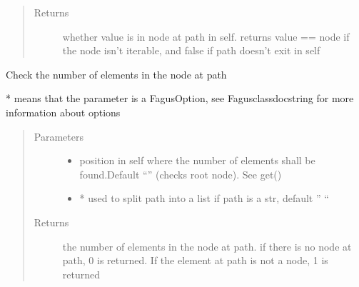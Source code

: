 \documentclass[a4paper,10pt,english]{sphinxmanual}
\begin{document}
\begin{fulllineitems}
\begin{fulllineitems}
\begin{quote}
\begin{description}
\begin{itemize}
\end{itemize}

\item[{Returns}] \leavevmode
\sphinxAtStartPar
whether value is in node at path in self. returns value == node if the node isn’t iterable, and false if
path doesn’t exit in self

\end{description}\end{quote}

\end{fulllineitems}


\begin{fulllineitems}
\label{\detokenize{fagus.fagus:fagus.fagus.Fagus.count}}
\pysigstartsignatures
{}
\pysigstopsignatures
\sphinxAtStartPar
Check the number of elements in the node at path

\sphinxAtStartPar
* means that the parameter is a FagusOption, see Fagus\sphinxhyphen{}class\sphinxhyphen{}docstring for more information about options
\begin{quote}\begin{description}
\item[{Parameters}] \leavevmode\begin{itemize}
\item {}
\sphinxAtStartPar
{} \textendash{} position in self where the number of elements shall be found.Default “” (checks root node). See get()

\item {}
\sphinxAtStartPar
{} \textendash{} * used to split path into a list if path is a str, default ” “

\end{itemize}

\item[{Returns}] \leavevmode
\sphinxAtStartPar
the number of elements in the node at path. if there is no node at path, 0 is returned. If the element
at path is not a node, 1 is returned


\end{description}
\end{quote}
\end{fulllineitems}
\end{fulllineitems}
\end{document}
